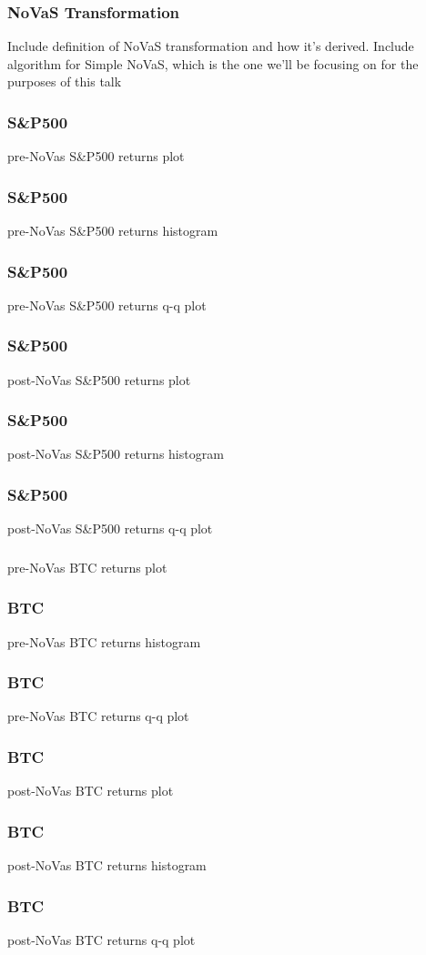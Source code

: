 \documentclass{beamer}
\begin{document}
\begin{frame}
\frametitle{NoVaS Transformation}
Include definition of NoVaS transformation and how it's derived.
Include algorithm for Simple NoVaS, which is the one we'll be focusing on for the purposes of this talk
\end{frame}


\begin{frame}
\frametitle{S&P500}
pre-NoVas S&P500 returns plot
\end{frame}

\begin{frame}
\frametitle{S&P500}
pre-NoVas S&P500 returns histogram
\end{frame}

\begin{frame}
\frametitle{S&P500}
pre-NoVas S&P500 returns q-q plot
\end{frame}

\begin{frame}
\frametitle{S&P500}
post-NoVas S&P500 returns plot
\end{frame}

\begin{frame}
\frametitle{S&P500}
post-NoVas S&P500 returns histogram
\end{frame}

\begin{frame}
\frametitle{S&P500}
post-NoVas S&P500 returns q-q plot
\end{frame}

\begin{frame}
\frametitle{}
pre-NoVas BTC returns plot
\end{frame}

\begin{frame}
\frametitle{BTC}
pre-NoVas BTC returns histogram
\end{frame}

\begin{frame}
\frametitle{BTC}
pre-NoVas BTC returns q-q plot
\end{frame}

\begin{frame}
\frametitle{BTC}
post-NoVas BTC returns plot
\end{frame}

\begin{frame}
\frametitle{BTC}
post-NoVas BTC returns histogram
\end{frame}

\begin{frame}
\frametitle{BTC}
post-NoVas BTC returns q-q plot
\end{frame}
\end{document}

